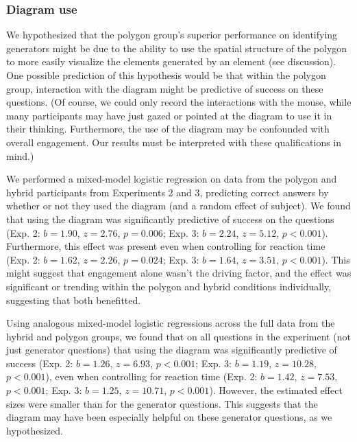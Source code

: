 \documentclass[man,mask,10pt]{apa6}
\begin{document}
\subsubsection{Diagram use}
We hypothesized that the polygon group's superior performance on identifying generators might be due to the ability to use the spatial structure of the polygon to more easily visualize the elements generated by an element (see discussion). One possible prediction of this hypothesis would be that within the polygon group, interaction with the diagram might be predictive of success on these questions. (Of course, we could only record the interactions with the mouse, while many participants may have just gazed or pointed at the diagram to use it in their thinking. Furthermore, the use of the diagram may be confounded with overall engagement. Our results must be interpreted with these qualifications in mind.) \par
We performed a mixed-model logistic regression on data from the polygon and hybrid participants from Experiments 2 and 3, predicting correct answers by whether or not they used the diagram (and a random effect of subject). We found that using the diagram was significantly predictive of success on the questions (Exp. 2: $b=1.90$, $z = 2.76$, $p = 0.006$; Exp. 3: $b=2.24$, $z = 5.12$, $p < 0.001$). Furthermore, this effect was present even when controlling for reaction time (Exp. 2: $b = 1.62$, $z = 2.26$, $p = 0.024$; Exp. 3: $b = 1.64$, $z = 3.51$, $p < 0.001$). This might suggest that engagement alone wasn't the driving factor, and the effect was significant or trending within the polygon and hybrid conditions individually, suggesting that both benefitted. \par
Using analogous mixed-model logistic regressions across the full data from the hybrid and polygon groups, we found that on all questions in the experiment (not just generator questions) that using the diagram was significantly predictive of success (Exp. 2: $b = 1.26$, $z = 6.93$, $p < 0.001$; Exp. 3: $b = 1.19$, $z= 10.28$, $p < 0.001$), even when controlling for reaction time (Exp. 2: $b = 1.42$, $z = 7.53$, $p < 0.001$; Exp. 3: $b = 1.25$, $z = 10.71$, $p < 0.001$). However, the estimated effect sizes were smaller than for the generator questions. This suggests that the diagram may have been especially helpful on these generator questions, as we hypothesized. \\
\end{document}
